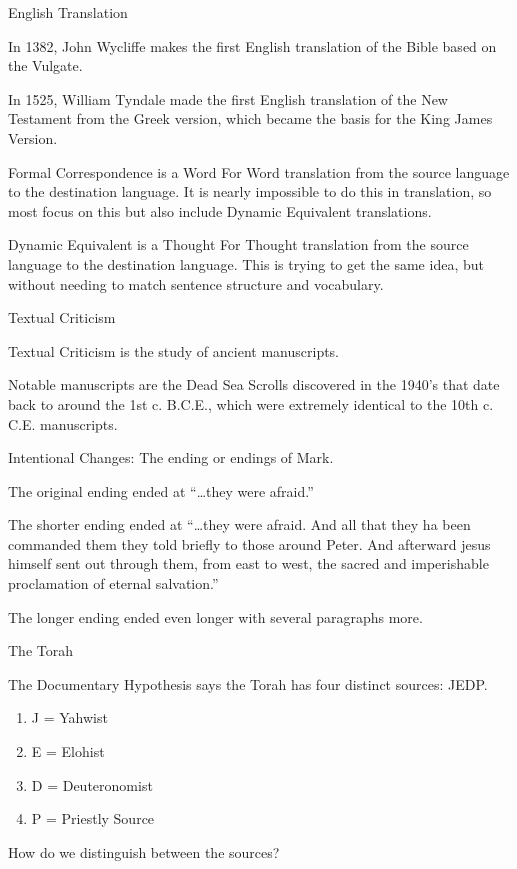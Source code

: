 \documentclass{article}
\begin{document}
\centerline{English Translation}

    In 1382, John Wycliffe makes the first English translation of the Bible based on the Vulgate.

    In 1525, William Tyndale made the first English translation of the New Testament from the Greek version, which became the basis for the King James Version.
    
    Formal Correspondence is a Word For Word translation from the source language to the destination language. It is nearly impossible to do this in translation, so most focus on this but also include Dynamic Equivalent translations.

    Dynamic Equivalent is a Thought For Thought translation from the source language to the destination language. This is trying to get the same idea, but without needing to match sentence structure and vocabulary.

\centerline{Textual Criticism}

    Textual Criticism is the study of ancient manuscripts.

    Notable manuscripts are the Dead Sea Scrolls discovered in the 1940's that date back to around the 1st c. B.C.E., which were extremely identical to the 10th c. C.E. manuscripts.

    Intentional Changes: The ending or endings of Mark.

    The original ending ended at ``\ldots they were afraid.''

    The shorter ending ended at ``\ldots they were afraid. And all that they ha been commanded them they told briefly to those around Peter. And afterward jesus himself sent out through them, from east to west, the sacred and imperishable proclamation of eternal salvation.''

    The longer ending ended even longer with several paragraphs more.

\centerline{The Torah}

    The Documentary Hypothesis says the Torah has four distinct sources: JEDP.\@

    \begin{enumerate}
        \item J = Yahwist
        \item E = Elohist
        \item D = Deuteronomist
        \item P = Priestly Source
    \end{enumerate}

    How do we distinguish between the sources?
\end{document}
